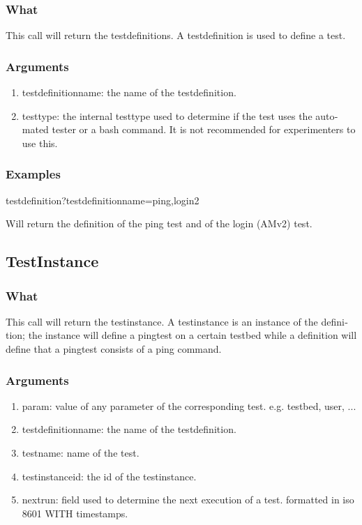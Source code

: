 \begin{otherlanguage}{english}
\subsubsection{What}
This call will return the testdefinitions. A testdefinition is used to define a test.
\subsubsection{Arguments}
\begin{enumerate}
\item testdefinitionname: the name of the testdefinition.
\item testtype: the internal testtype used to determine if the test uses the automated tester or a bash command. It is not recommended for experimenters to use this.
\end{enumerate}
\subsubsection{Examples}
\begin{lt}
testdefinition?testdefinitionname=ping,login2
\end{lt}
Will return the definition of the ping test and of the login (AMv2) test.
\\
\subsection{TestInstance}
\subsubsection{What}
This call will return the testinstance. A testinstance is an instance of the definition; the instance will define a pingtest on a certain testbed while a definition will define that a pingtest consists of a ping command. 
\subsubsection{Arguments}
\begin{enumerate}
\item param: value of any parameter of the corresponding test. e.g. testbed, user, ...
\item testdefinitionname: the name of the testdefinition.
\item testname: name of the test.
\item testinstanceid: the id of the testinstance.
\item nextrun: field used to determine the next execution of a test. formatted in iso 8601 WITH timestamps.
\end{enumerate}
\clearpage

\end{otherlanguage}
